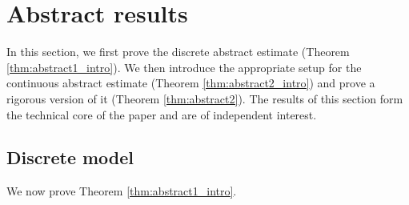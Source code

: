 \documentclass[12pt,reqno]{amsart}
\theoremstyle{definition}
\theoremstyle{remark}
\numberwithin{equation}{section}
\newcommand{\1}{\mathbbm{1}}
\begin{document}
\section{Abstract results}

In this section, we first prove the discrete abstract estimate (Theorem \ref{thm:abstract1_intro}). We then introduce the appropriate setup for the continuous abstract estimate (Theorem \ref{thm:abstract2_intro}) and prove a rigorous version of it  (Theorem \ref{thm:abstract2}). The results of this section form the technical core of the paper and are of independent interest.

\subsection{Discrete model} We now prove Theorem \ref{thm:abstract1_intro}.
\end{document}
